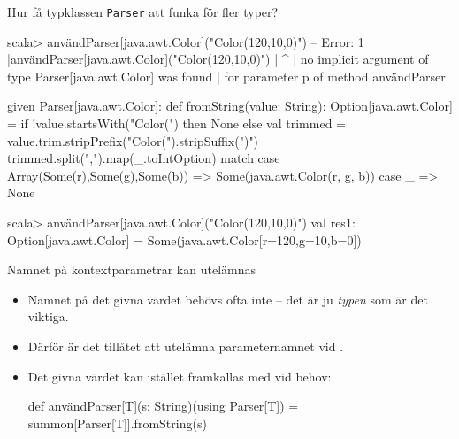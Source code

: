 \begin{Slide}{Hur få typklassen \texttt{Parser} att funka för fler typer?}
\begin{REPLsmall}
scala> användParser[java.awt.Color]("Color(120,10,0)")
-- Error:
1 |användParser[java.awt.Color]("Color(120,10,0)")
  |                                        ^
  | no implicit argument of type Parser[java.awt.Color] was found 
  | for parameter p of method användParser
\end{REPLsmall}
\begin{Code}
given Parser[java.awt.Color]:
  def fromString(value: String): Option[java.awt.Color] =
    if !value.startsWith("Color(") then None else 
      val trimmed = value.trim.stripPrefix("Color(").stripSuffix(")")
      trimmed.split(",").map(_.toIntOption) match
        case Array(Some(r),Some(g),Some(b)) => Some(java.awt.Color(r, g, b))
        case _ => None
\end{Code}
\begin{REPLsmall}
scala> användParser[java.awt.Color]("Color(120,10,0)")
val res1: Option[java.awt.Color] = Some(java.awt.Color[r=120,g=10,b=0])
\end{REPLsmall}
\end{Slide}


\begin{Slide}{Namnet på kontextparametrar kan utelämnas}\SlideFontSmall
\begin{itemize}\SlideFontSmall
\item Namnet på det givna värdet behövs ofta inte -- det är ju \emph{typen} som är det viktiga.
\item Därför är det tillåtet att utelämna parameternamnet vid . 
\item Det givna värdet kan istället framkallas med  vid behov:%
\begin{Code}
def användParser[T](s: String)(using Parser[T]) = 
  summon[Parser[T]].fromString(s)
\end{Code}
\end{itemize}

\end{Slide}


